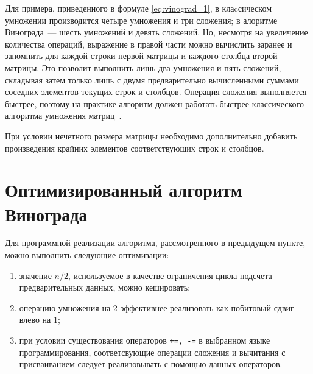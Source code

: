 Для примера, приведенного в формуле \ref{eq:vinograd_1}, в клаcсическом умножении производится четыре умножения и три сложения; в алоритме Винограда~--- шесть умножений и девять сложений. Но, несмотря на увеличение количества операций, выражение в правой части можно вычислить заранее и запомнить для каждой строки первой матрицы и каждого столбца второй матрицы.
Это позволит выполнить лишь два умножения и пять сложений, складывая затем только лишь с двумя предварительно вычисленными суммами соседних элементов текущих строк и столбцов. Операция сложения выполняется быстрее, поэтому на практике алгоритм должен работать быстрее классического алгоритма умножения матриц~\cite{vinograd-alg}.

При условии нечетного размера матрицы необходимо дополнительно добавить произведения крайних элементов соответствующих строк и столбцов.

\section{Оптимизированный алгоритм Винограда}
Для программной реализации алгоритма, рассмотренного в предыдущем пункте, можно выполнить следующие оптимизации:
\begin{enumerate}
    \item значение $n / 2$, используемое в качестве ограничения цикла подсчета предварительных данных, можно кешировать;
    \item операцию умножения на 2 эффективнее реализовать как побитовый сдвиг влево на 1;
    \item при условии существования операторов \texttt{+=, -=} в выбранном языке программирования, соответсвующие операции сложения и вычитания с присваиванием следует реализовывать с помощью данных операторов.
\end{enumerate}


